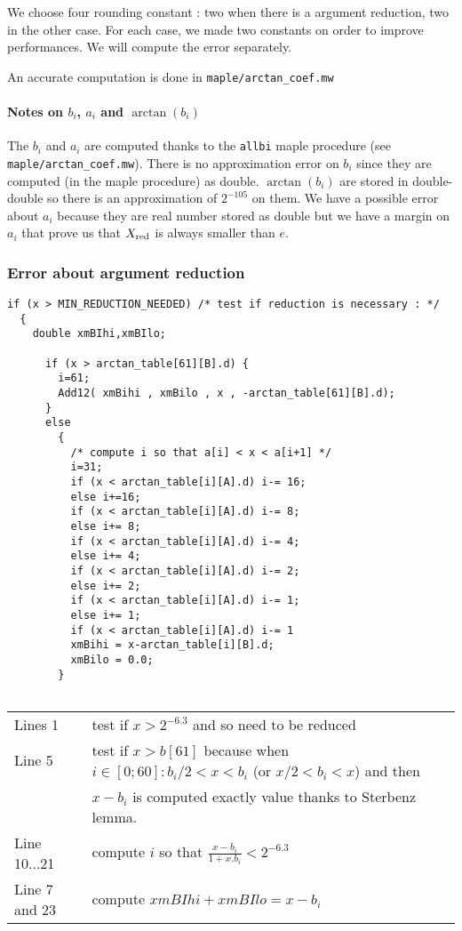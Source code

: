 We choose four rounding constant : two when there is a argument reduction, two in
the other case. For each case, we made two constants on order to
improve performances. We will compute the error separately.

An accurate computation is done in \texttt{maple/arctan\_coef.mw} 

\paragraph{Notes on $b_i$, $a_i$ and $\arctan(b_i)$}
The $b_i$ and $a_i$ are computed thanks to the \texttt{allbi} maple
procedure (see \texttt{maple/arctan\_coef.mw}). There is no approximation
error on $b_i$ since they are computed (in the maple procedure) as
double. $\arctan (b_i)$ are stored in double-double so there is an
approximation of $2^{-105}$ on them. We have a possible error about $a_i$
because they are real number stored as double but we have a margin on $a_i$
that prove us that $X_{\mathrm{red}}$ is always smaller than $e$.

\subsubsection{Error about argument reduction}

\begin{lstlisting}[caption={Reduction part 1},firstnumber=1]
  if (x > MIN_REDUCTION_NEEDED) /* test if reduction is necessary : */ 
  {
    double xmBIhi,xmBIlo;      

      if (x > arctan_table[61][B].d) {
        i=61;
        Add12( xmBihi , xmBilo , x , -arctan_table[61][B].d);
      }
      else
        {
          /* compute i so that a[i] < x < a[i+1] */
          i=31;
          if (x < arctan_table[i][A].d) i-= 16;
          else i+=16;
          if (x < arctan_table[i][A].d) i-= 8;
          else i+= 8;
          if (x < arctan_table[i][A].d) i-= 4;
          else i+= 4;
          if (x < arctan_table[i][A].d) i-= 2;
          else i+= 2;
          if (x < arctan_table[i][A].d) i-= 1;
          else i+= 1;
          if (x < arctan_table[i][A].d) i-= 1
          xmBihi = x-arctan_table[i][B].d;
          xmBilo = 0.0;
        }
      
\end{lstlisting}

\begin{tabular}{ll}
Lines  1 & test if $x > 2^{-6.3}$ and so need to be reduced\\
Line 5 & test if $x>b[61]$ because when $i \in [0;60] : b_i/2 < x <
b_i$ (or $ x/2 < b_i < x$) and then \\&$x-b_i$ is computed exactly
value thanks to Sterbenz lemma.\\
Line 10...21 & compute $i$ so that $\frac{x-b_i}{1+x.b_i} < 2^{-6.3} $\\
Line 7 and 23 & compute $xmBIhi + xmBIlo = x - b_i$

\end{tabular}


